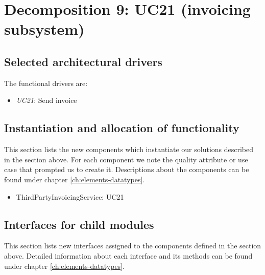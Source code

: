 \section{Decomposition 9: UC21 (invoicing subsystem)}


\subsection*{Selected architectural drivers}
    The functional drivers are:
    \begin{itemize}
        \item \emph{UC21}: Send invoice
    \end{itemize}


\subsection*{Instantiation and allocation of functionality}
    This section lists the new components which instantiate our solutions
    described in the section above. For each component we note the quality
    attribute or use case that prompted us to create it. Descriptions about
    the components can be found under chapter \ref{ch:elements-datatypes}. \\

    \begin{itemize}
        \item ThirdPartyInvoicingService: UC21
    \end{itemize}


\subsection*{Interfaces for child modules}
    This section lists new interfaces assigned to the components defined
    in the section above. Detailed information about each interface and
    its methods can be found under chapter \ref{ch:elements-datatypes}.

